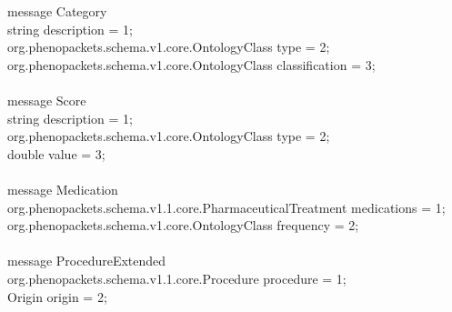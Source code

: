 \documentclass[a4paper, 10pt]{article}
\begin{document}
message \colorbox{yellow!80}{Category} \ { \\
    string description = 1; \\
    org.phenopackets.schema.v1.core.OntologyClass type = 2; \\
    org.phenopackets.schema.v1.core.OntologyClass classification = 3; \\
\ } \\




message \colorbox{yellow!80}{Score} \ { \\
    string description = 1; \\
    org.phenopackets.schema.v1.core.OntologyClass type = 2; \\
    double value = 3; \\
\ } \\




message \colorbox{yellow!80}{Medication} \ { \\
    org.phenopackets.schema.v1.1.core.PharmaceuticalTreatment medications = 1; \\
    org.phenopackets.schema.v1.core.OntologyClass frequency = 2; \\
\ } \\




message \colorbox{yellow!80}{ProcedureExtended} \ { \\
    org.phenopackets.schema.v1.1.core.Procedure procedure = 1; \\
    Origin origin = 2; \\
\ } \\
\end{document}
